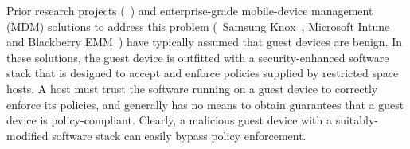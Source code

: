 Prior research projects
(\eg~\cite{asm:sec14,flaskdroid:sec13,conxsense:asiaccs14,worlddriven:ccs14,blindspot:2009,markit:upside14})
and enterprise-grade mobile-device management (MDM) solutions to address this
problem (\eg\ Samsung Knox~\cite{knox:mdm}, Microsoft Intune~\cite{ms:intune}
and Blackberry EMM~\cite{blackberry:emm}) have typically assumed that guest
devices are benign. In these solutions, the guest device is outfitted with a
security-enhanced software stack that is designed to accept and enforce
policies supplied by restricted space hosts. A host must trust the software
running on a guest device to correctly enforce its policies, and generally has
no means to obtain guarantees that a guest device is policy-compliant. Clearly,
a malicious guest device with a suitably-modified software stack can easily
bypass policy enforcement.

